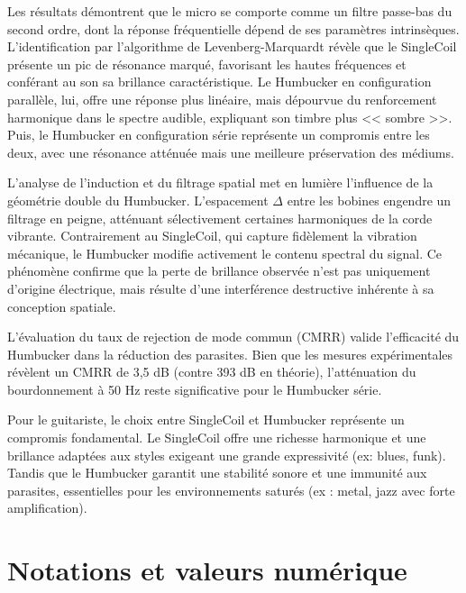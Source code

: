 \documentclass[11pt, a4paper]{article}
\begin{document}
Les résultats démontrent que le micro se comporte comme un filtre passe-bas du second ordre, dont la réponse fréquentielle dépend de ses paramètres intrinsèques. L'identification par l'algorithme de Levenberg-Marquardt révèle que le SingleCoil présente un pic de résonance marqué, favorisant les hautes fréquences et conférant au son sa brillance caractéristique. Le Humbucker en configuration parallèle, lui, offre une réponse plus linéaire, mais dépourvue du renforcement harmonique dans le spectre audible, expliquant son timbre plus << sombre >>. Puis, le Humbucker en configuration série représente un compromis entre les deux, avec une résonance atténuée mais une meilleure préservation des médiums.

L'analyse de l'induction et du filtrage spatial met en lumière l'influence de la géométrie double du Humbucker. L'espacement $\Delta$ entre les bobines engendre un filtrage en peigne, atténuant sélectivement certaines harmoniques de la corde vibrante. Contrairement au SingleCoil, qui capture fidèlement la vibration mécanique, le Humbucker modifie activement le contenu spectral du signal. Ce phénomène confirme que la perte de brillance observée n'est pas uniquement d'origine électrique, mais résulte d'une interférence destructive inhérente à sa conception spatiale.

L'évaluation du taux de rejection de mode commun (CMRR) valide l'efficacité du Humbucker dans la réduction des parasites. Bien que les mesures expérimentales révèlent un CMRR de 3,5 dB (contre 393 dB en théorie), l'atténuation du bourdonnement à 50 Hz reste significative pour le Humbucker série.

Pour le guitariste, le choix entre SingleCoil et Humbucker représente un compromis fondamental. Le SingleCoil offre une richesse harmonique et une brillance adaptées aux styles exigeant une grande expressivité (ex: blues, funk). Tandis que le Humbucker garantit une stabilité sonore et une immunité aux parasites, essentielles pour les environnements saturés (ex : metal, jazz avec forte amplification).

\newpage
\section{Notations et valeurs numérique}
\end{document}
